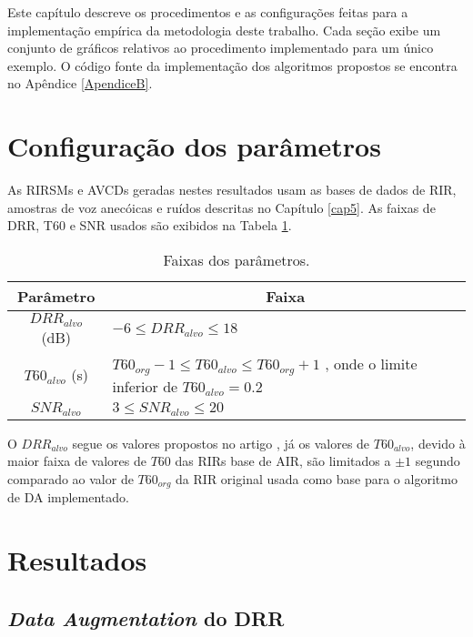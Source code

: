 Este capítulo descreve os procedimentos e as configurações feitas para a implementação empírica da metodologia deste trabalho.
Cada seção exibe um conjunto de gráficos relativos ao procedimento implementado para um único exemplo.
O código fonte da implementação dos algoritmos propostos se encontra no Apêndice \ref{ApendiceB}.

\section{Configuração dos parâmetros}

As RIRSMs e AVCDs geradas nestes resultados usam as bases de dados de RIR, amostras de voz anecóicas e ruídos descritas no Capítulo \ref{cap5}.
As faixas de DRR, T60 e SNR usados são exibidos na Tabela \ref{tbl:config-param}.

\begin{table} [H]
    \centering
    \caption{Faixas dos parâmetros.}
    \label{tbl:config-param}
    \begin{tabular}{c|p{9cm}}

        \multicolumn{1}{c|}{\textbf{Parâmetro}} & \multicolumn{1}{c}{\textbf{Faixa}} \\
        \hline 

        $DRR_{alvo}$ (dB) & $-6 \le DRR_{alvo} \le 18 $ \\
        $T60_{alvo}$ (s) & $T60_{org} - 1  \le T60_{alvo} \le T60_{org} + 1$ , onde o limite inferior de $T60_{alvo} = 0.2$ \\
        $SNR_{alvo}$ & $3 \le SNR_{alvo} \le 20 $ \\

    \end{tabular}
\end{table}

O $DRR_{alvo}$ segue os valores propostos no artigo \cite{RIR_Data_Aug}, já os valores de $T60_{alvo}$, devido à maior faixa de valores 
de $T60$ das RIRs base de AIR, são limitados a $\pm 1 $ segundo comparado ao valor de $T60_{org}$ da RIR original usada como base para o algoritmo
de DA implementado.

\section{Resultados}

\subsection{\textit{Data Augmentation} do DRR}

